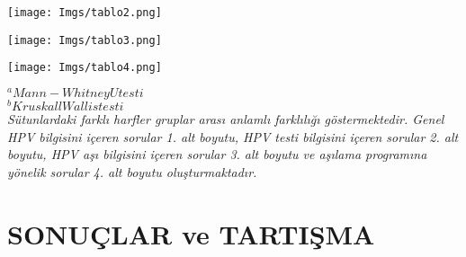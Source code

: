 \documentclass[turkish]{article}
\begin{document}
\newpage
\begin{center}
    
    \centering
    \texttt{[image: Imgs/tablo2.png]}
    \caption{}
    \label{}
\end{center}


\newpage
\begin{center}
    
    \centering
    \texttt{[image: Imgs/tablo3.png]}
    \caption{}
    \label{}
\end{center}
\newpage
\begin{center}
    
    \centering
    \texttt{[image: Imgs/tablo4.png]}
    \caption{}
    \label{}
\end{center}
 $^aMann-WhitneyU testi$
 \\
 $^bKruskall Wallis testi$
 \\
\textit{Sütunlardaki farklı harfler gruplar arası anlamlı farklılığı göstermektedir. Genel HPV bilgisini içeren sorular 1. alt boyutu, HPV testi bilgisini içeren sorular 2. alt boyutu, HPV aşı bilgisini içeren sorular 3. alt boyutu ve aşılama programına yönelik sorular 4. alt boyutu oluşturmaktadır.}
\newpage
\section{SONUÇLAR ve TARTIŞMA}
\end{document}
